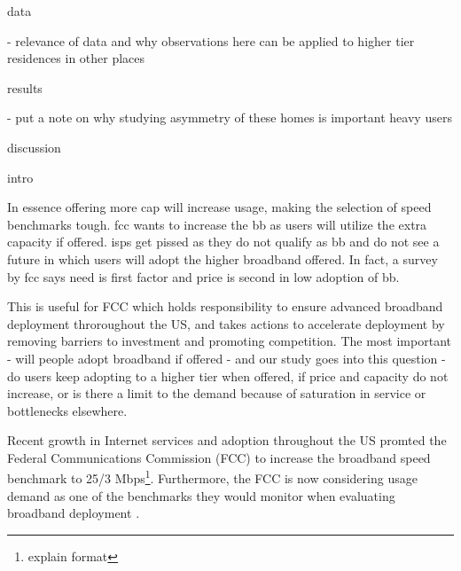 data

- relevance of data and why observations here can be applied to higher tier residences in other places


results

- put a note on why studying asymmetry of these homes is important heavy users


discussion


intro

In essence offering more cap will increase usage, making the selection of speed benchmarks tough. fcc wants to increase the bb as users will utilize the extra capacity if offered. isps get pissed as they do not qualify as bb and do not see a future in which users will adopt the higher broadband offered. In fact, a survey by fcc says need is first factor and price is second in low adoption of bb.

This is useful for FCC which holds responsibility to ensure advanced broadband deployment throroughout the US, and takes actions to accelerate deployment by removing barriers to investment and promoting competition. The most important - will people adopt broadband if offered - and our study goes into this question - do users keep adopting to a higher tier when offered, if price and capacity do not increase, or is there a limit to the demand because of saturation in service or bottlenecks elsewhere.

Recent growth in Internet services and adoption throughout the US promted the Federal Communications Commission (FCC) to increase the broadband speed benchmark to 25/3 Mbps\footnote{explain format}. Furthermore, the FCC is now considering usage demand as one of the benchmarks they would monitor when evaluating broadband deployment \cite{fcc2015broadband-report}.